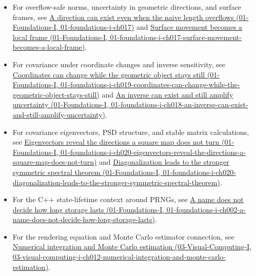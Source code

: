 \begin{itemize}
\tightlist
\item
  For overflow-safe norms, uncertainty in geometric directions, and surface frames, see \href{../01-Foundations-I/main.pdf\#nameddest=01-foundations-i-ch017}{A direction can exist even when the naive length overflows (01-Foundations-I, 01-foundations-i-ch017)} and \href{../01-Foundations-I/main.pdf\#nameddest=01-foundations-i-ch017-surface-movement-becomes-a-local-frame}{Surface movement becomes a local frame (01-Foundations-I, 01-foundations-i-ch017-surface-movement-becomes-a-local-frame)}.
\item
  For covariance under coordinate changes and inverse sensitivity, see \href{../01-Foundations-I/main.pdf\#nameddest=01-foundations-i-ch019-coordinates-can-change-while-the-geometric-object-stays-still}{Coordinates can change while the geometric object stays still (01-Foundations-I, 01-foundations-i-ch019-coordinates-can-change-while-the-geometric-object-stays-still)} and \href{../01-Foundations-I/main.pdf\#nameddest=01-foundations-i-ch018-an-inverse-can-exist-and-still-amplify-uncertainty}{An inverse can exist and still amplify uncertainty (01-Foundations-I, 01-foundations-i-ch018-an-inverse-can-exist-and-still-amplify-uncertainty)}.
\item
  For covariance eigenvectors, PSD structure, and stable matrix calculations, see \href{../01-Foundations-I/main.pdf\#nameddest=01-foundations-i-ch020-eigenvectors-reveal-the-directions-a-square-map-does-not-turn}{Eigenvectors reveal the directions a square map does not turn (01-Foundations-I, 01-foundations-i-ch020-eigenvectors-reveal-the-directions-a-square-map-does-not-turn)} and \href{../01-Foundations-I/main.pdf\#nameddest=01-foundations-i-ch020-diagonalization-leads-to-the-stronger-symmetric-spectral-theorem}{Diagonalization leads to the stronger symmetric spectral theorem (01-Foundations-I, 01-foundations-i-ch020-diagonalization-leads-to-the-stronger-symmetric-spectral-theorem)}.
\item
  For the C++ state-lifetime context around PRNGs, see \href{../01-Foundations-I/main.pdf\#nameddest=01-foundations-i-ch002-a-name-does-not-decide-how-long-storage-lasts}{A name does not decide how long storage lasts (01-Foundations-I, 01-foundations-i-ch002-a-name-does-not-decide-how-long-storage-lasts)}.
\item
  For the rendering equation and Monte Carlo estimator connection, see \href{../03-Visual-Computing-I/main.pdf\#nameddest=03-visual-computing-i-ch012-numerical-integration-and-monte-carlo-estimation}{Numerical integration and Monte Carlo estimation (03-Visual-Computing-I, 03-visual-computing-i-ch012-numerical-integration-and-monte-carlo-estimation)}.
\end{itemize}

